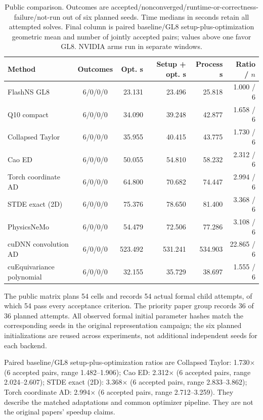 \documentclass[11pt]{article}
\begin{document}
\begin{table}[t]
\centering\small
\setlength{\tabcolsep}{4pt}
\caption{Public comparison. Outcomes are accepted/nonconverged/runtime-or-correctness-failure/not-run out of six planned seeds. Time medians in seconds retain all attempted solves. Final column is paired baseline/GL8 setup-plus-optimization geometric mean and number of jointly accepted pairs; values above one favor GL8. NVIDIA arms run in separate windows.}
\label{tab:public}
\begin{tabular}{lcrrrr}\toprule
Method & Outcomes & Opt. s & Setup + opt. s & Process s & Ratio / $n$\\\midrule
FlashNS GL8 & 6/0/0/0 & 23.131 & 23.496 & 25.818 & 1.000 / 6\\
Q10 compact & 6/0/0/0 & 34.090 & 39.248 & 42.877 & 1.658 / 6\\
Collapsed Taylor & 6/0/0/0 & 35.955 & 40.415 & 43.775 & 1.730 / 6\\
Cao ED & 6/0/0/0 & 50.055 & 54.810 & 58.232 & 2.312 / 6\\
Torch coordinate AD & 6/0/0/0 & 64.800 & 70.682 & 74.447 & 2.994 / 6\\
STDE exact (2D) & 6/0/0/0 & 75.376 & 78.650 & 81.400 & 3.368 / 6\\
PhysicsNeMo & 6/0/0/0 & 54.479 & 72.506 & 77.286 & 3.108 / 6\\
cuDNN convolution AD & 6/0/0/0 & 523.492 & 531.241 & 534.903 & 22.865 / 6\\
cuEquivariance polynomial & 6/0/0/0 & 32.155 & 35.729 & 38.697 & 1.555 / 6\\
\bottomrule\end{tabular}
\end{table}

The public matrix plans 54 cells and records 54 actual formal child attempts, of which 54 pass every acceptance criterion. The priority paper group records 36 of 36 planned attempts. All observed formal initial parameter hashes match the corresponding seeds in the original representation campaign; the six planned initializations are reused across experiments, not additional independent seeds for each backend.

Paired baseline/GL8 setup-plus-optimization ratios are Collapsed Taylor: 1.730$\times$ (6 accepted pairs, range 1.482--1.906); Cao ED: 2.312$\times$ (6 accepted pairs, range 2.024--2.607); STDE exact (2D): 3.368$\times$ (6 accepted pairs, range 2.833--3.862); Torch coordinate AD: 2.994$\times$ (6 accepted pairs, range 2.712--3.259). They describe the matched adaptations and common optimizer pipeline. They are not the original papers' speedup claims.
\end{document}
